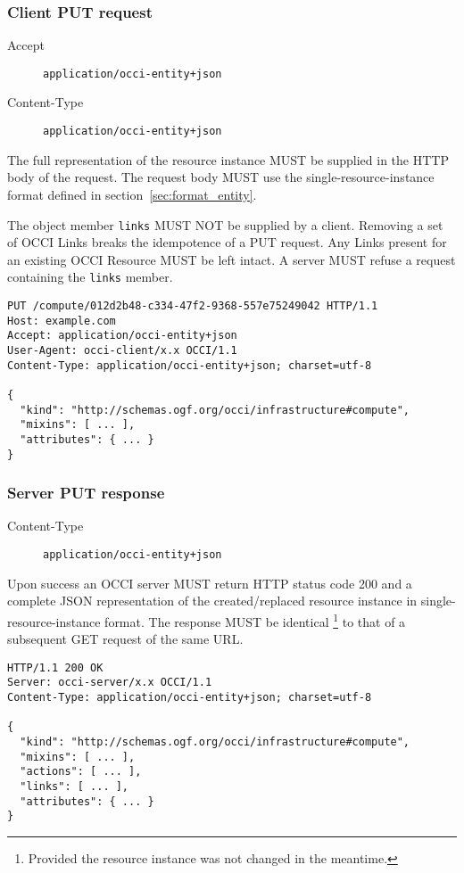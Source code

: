 \documentclass[10pt,a4paper]{article}
\begin{document}
\subsubsection{Client PUT request}
\begin{description}
\item[Accept] {\tt application/occi-entity+json}
\item[Content-Type] {\tt application/occi-entity+json}
\end{description}
The full representation of the resource instance MUST be supplied in the HTTP
body of the request. The request body MUST use the single-resource-instance
format defined in section~\ref{sec:format_entity}.

The object member {\tt links} MUST NOT be supplied by a client. Removing a set
of OCCI Links breaks the idempotence of a PUT request. Any Links present for an
existing OCCI Resource MUST be left intact. A server MUST refuse a request
containing the {\tt links} member.

\begin{verbatim}
PUT /compute/012d2b48-c334-47f2-9368-557e75249042 HTTP/1.1
Host: example.com
Accept: application/occi-entity+json
User-Agent: occi-client/x.x OCCI/1.1
Content-Type: application/occi-entity+json; charset=utf-8

{
  "kind": "http://schemas.ogf.org/occi/infrastructure#compute",
  "mixins": [ ... ],
  "attributes": { ... }
}
\end{verbatim}

\subsubsection{Server PUT response}
\begin{description}
\item[Content-Type] {\tt application/occi-entity+json}
\end{description}
Upon success an OCCI server MUST return HTTP status code 200 and a complete
JSON representation of the created/replaced resource instance in
single-resource-instance format.
The response MUST be identical%
\footnote{Provided the resource instance was not changed in the meantime.}
to that of a subsequent GET request of the same URL.

\begin{verbatim}
HTTP/1.1 200 OK
Server: occi-server/x.x OCCI/1.1
Content-Type: application/occi-entity+json; charset=utf-8

{
  "kind": "http://schemas.ogf.org/occi/infrastructure#compute",
  "mixins": [ ... ],
  "actions": [ ... ],
  "links": [ ... ],
  "attributes": { ... }
}
\end{verbatim}
\end{document}
